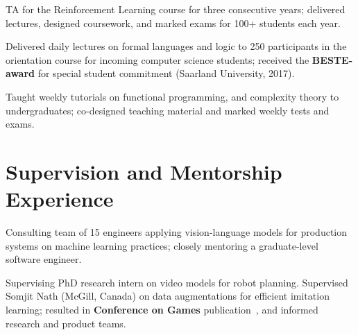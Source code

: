 \documentclass[a4paper,12pt]{article}
\begin{document}
\begin{expblock}
    TA for the Reinforcement Learning course for three consecutive years; delivered lectures, designed coursework, and marked exams for 100+ students each year.
\end{expblock}

\begin{expblock}
    Delivered daily lectures on formal languages and logic to 250 participants in the orientation course for incoming computer science students; received the \textbf{BESTE-award} for special student commitment (Saarland University, 2017).
\end{expblock}

\begin{expblock}
    Taught weekly tutorials on functional programming, and complexity theory to undergraduates; co-designed teaching material and marked weekly tests and exams.
\end{expblock}

\section{Supervision and Mentorship Experience}

\begin{expblock}
    Consulting team of 15 engineers applying vision-language models for production systems on machine learning practices; closely mentoring a graduate-level software engineer.
\end{expblock}

\begin{expblock}
    Supervising PhD research intern on video models for robot planning. Supervised Somjit Nath (McGill, Canada) on data augmentations for efficient imitation learning; resulted in \textbf{Conference on Games} publication~\cite{nath2026somjit}, and informed research and product teams. %
\end{expblock}
\end{document}
